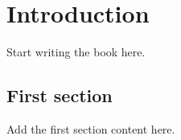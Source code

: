 \chapter{Introduction}

Start writing the book here.

\section{First section}

Add the first section content here.
